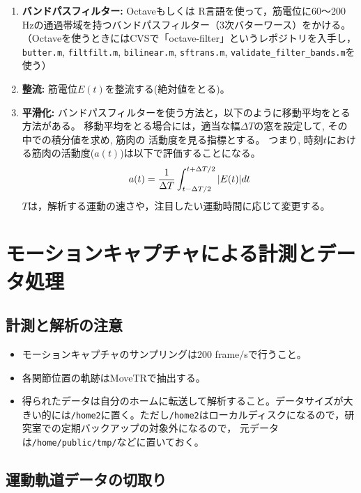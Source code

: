 \documentclass{jarticle}
\begin{document}
\begin{enumerate}
\item \textbf{バンドパスフィルター: }Octaveもしくは R言語を使って，筋電位に60〜200 Hzの通過帯域を持つバンドパスフィルター（3次バターワース）をかける。
  （Octaveを使うときにはCVSで「octave-filter」というレポジトリを入手し，
  \verb|butter.m|, \verb|filtfilt.m|, \verb|bilinear.m|, \verb|sftrans.m|, 
  \verb|validate_filter_bands.m|を使う）
\item \textbf{整流: }筋電位$E(t)$を整流する(絶対値をとる)。
\item \textbf{平滑化: } 
バンドパスフィルターを使う方法と，以下のように移動平均をとる方法がある。
移動平均をとる場合には，適当な幅$\Delta T$の窓を設定して, その中での積分値を求め, 筋肉の
  活動度を見る指標とする。
つまり, 時刻$t$における筋肉の活動度($a(t)$)は以下で評価することになる。
\begin{align}
  a(t)=\frac{1}{\Delta T}\int_{t-\Delta T/2}^{t+\Delta T/2}|E(t)|dt\notag
\end{align}
$T$は，解析する運動の速さや，注目したい運動時間に応じて変更する。
\end{enumerate}

\section{モーションキャプチャによる計測とデータ処理}

\subsection{計測と解析の注意}
\begin{itemize}
\item モーションキャプチャのサンプリングは200 frame$/$sで行うこと。
\item 各関節位置の軌跡はMoveTRで抽出する。
\item 得られたデータは自分のホームに転送して解析すること。データサイズが大きい的には\verb|/home2|に置く。ただし\verb|/home2|はローカルディスクになるので，研究室での定期バックアップの対象外になるので，
元データは\verb|/home/public/tmp/|などに置いておく。
\end{itemize}

\subsection{運動軌道データの切取り}
\end{document}
